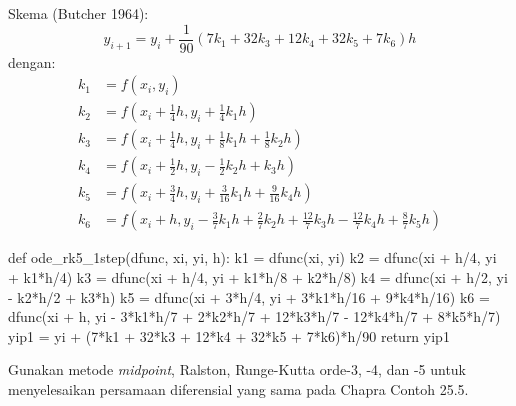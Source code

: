 Skema (Butcher 1964):
\begin{equation*}
y_{i+1} = y_i + \frac{1}{90} ( 7 k_1 + 32 k_3 + 12 k_4 + 32 k_5 + 7 k_6) h
\end{equation*}
dengan:
\begin{align*}
k_1 & = f(x_i, y_i) \\
k_2 & = f\left( x_i + \frac{1}{4}h, y_i + \frac{1}{4} k_1 h \right) \\
k_3 & = f\left( x_i + \frac{1}{4}h, y_i + \frac{1}{8} k_1 h + \frac{1}{8} k_2 h \right) \\
k_4 & = f\left( x_i + \frac{1}{2}h, y_i - \frac{1}{2} k_2 h + k_3 h \right) \\
k_5 & = f\left( x_i + \frac{3}{4}h, y_i + \frac{3}{16} k_1 h + \frac{9}{16} k_4 h \right) \\
k_6 & = f\left( x_i + h, y_i - \frac{3}{7} k_1 h + \frac{2}{7} k_2 h +
\frac{12}{7}k_3 h - \frac{12}{7}k_4 h + \frac{8}{7}k_5 h \right)
\end{align*}

\begin{pythoncode}
def ode_rk5_1step(dfunc, xi, yi, h):
    k1 = dfunc(xi, yi)
    k2 = dfunc(xi + h/4, yi + k1*h/4)
    k3 = dfunc(xi + h/4, yi + k1*h/8 + k2*h/8)
    k4 = dfunc(xi + h/2, yi - k2*h/2 + k3*h)
    k5 = dfunc(xi + 3*h/4, yi + 3*k1*h/16 + 9*k4*h/16)
    k6 = dfunc(xi + h, yi - 3*k1*h/7 + 2*k2*h/7 + 12*k3*h/7 - 12*k4*h/7 + 8*k5*h/7)
    yip1 = yi + (7*k1 + 32*k3 + 12*k4 + 32*k5 + 7*k6)*h/90
    return yip1
\end{pythoncode}


\begin{soal}
Gunakan metode \textit{midpoint}, Ralston, Runge-Kutta orde-3, -4, dan -5 untuk
menyelesaikan persamaan diferensial yang sama pada Chapra Contoh 25.5.
\end{soal}





